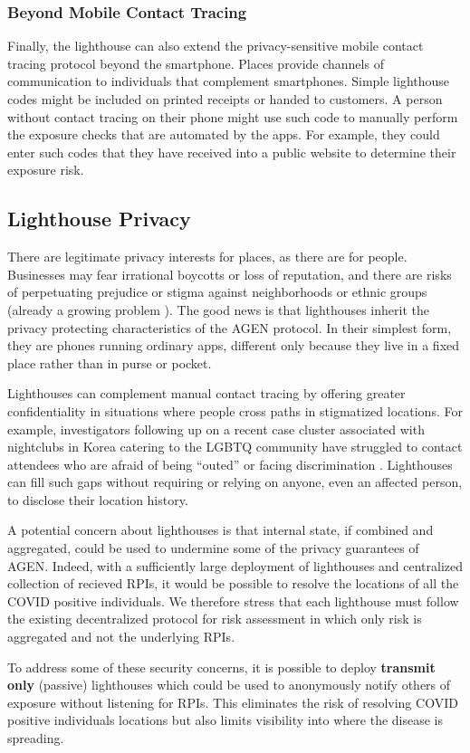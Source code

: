 \subsubsection{Beyond Mobile Contact Tracing}
Finally, the lighthouse can also extend the privacy-sensitive mobile contact tracing protocol beyond the smartphone. Places provide channels of communication to individuals that complement smartphones. Simple lighthouse codes might be included on printed receipts or handed to customers. A person without contact tracing on their phone might use such code to manually perform the exposure checks that are automated by the apps. For example, they could enter such codes that they have received into a public website to determine their exposure risk.

\subsection{Lighthouse Privacy}
There are legitimate privacy interests for places, as there are for people. 
Businesses may fear irrational boycotts or loss of reputation, and there are risks of perpetuating prejudice or stigma against neighborhoods or ethnic groups (already a growing problem \cite{asianDiscrimination}). The good news is that lighthouses inherit the privacy protecting characteristics of the AGEN protocol. In their simplest form, they are phones running ordinary apps, different only because they live in a fixed place rather than in purse or pocket.

Lighthouses can complement manual contact tracing by offering greater confidentiality in situations where people cross paths in stigmatized locations. For example, investigators following up on a recent case cluster associated with nightclubs in Korea catering to the LGBTQ community have struggled to contact attendees who are afraid of being “outed” or facing discrimination \cite{koreaClub}. Lighthouses can fill such gaps without requiring or relying on anyone, even an affected person, to disclose their location history.

A potential concern about lighthouses is that internal state, if combined and aggregated, could be used to undermine some of the privacy guarantees of AGEN. 
Indeed, with a sufficiently large deployment of lighthouses and centralized collection of recieved RPIs, it would be possible to resolve the locations of all the COVID positive individuals.
We therefore stress that each lighthouse must follow the existing decentralized protocol for risk assessment in which only risk is aggregated and not the underlying RPIs.  

To address some of these security concerns, it is possible to deploy \textbf{transmit only} (passive) lighthouses which could be used to anonymously notify others of exposure without listening for RPIs.  
This eliminates the risk of resolving COVID positive individuals locations but also limits visibility into where the disease is spreading.  


